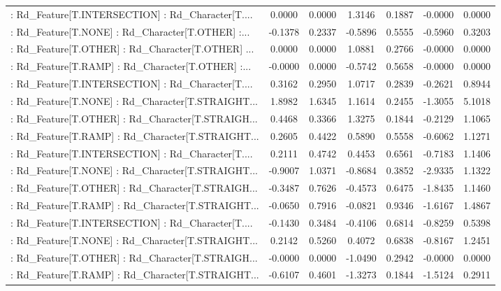 \begin{longtable}{p{4cm}cccccc}
 : Rd\_Feature[T.INTERSECTION] : Rd\_Character[T.... &  0.0000 &    0.0000 &  1.3146 &       0.1887 & -0.0000 &  0.0000 \\
 : Rd\_Feature[T.NONE] : Rd\_Character[T.OTHER] :... & -0.1378 &    0.2337 & -0.5896 &       0.5555 & -0.5960 &  0.3203 \\
 : Rd\_Feature[T.OTHER] : Rd\_Character[T.OTHER] ... &  0.0000 &    0.0000 &  1.0881 &       0.2766 & -0.0000 &  0.0000 \\
 : Rd\_Feature[T.RAMP] : Rd\_Character[T.OTHER] :... & -0.0000 &    0.0000 & -0.5742 &       0.5658 & -0.0000 &  0.0000 \\
 : Rd\_Feature[T.INTERSECTION] : Rd\_Character[T.... &  0.3162 &    0.2950 &  1.0717 &       0.2839 & -0.2621 &  0.8944 \\
 : Rd\_Feature[T.NONE] : Rd\_Character[T.STRAIGHT... &  1.8982 &    1.6345 &  1.1614 &       0.2455 & -1.3055 &  5.1018 \\
 : Rd\_Feature[T.OTHER] : Rd\_Character[T.STRAIGH... &  0.4468 &    0.3366 &  1.3275 &       0.1844 & -0.2129 &  1.1065 \\
 : Rd\_Feature[T.RAMP] : Rd\_Character[T.STRAIGHT... &  0.2605 &    0.4422 &  0.5890 &       0.5558 & -0.6062 &  1.1271 \\
 : Rd\_Feature[T.INTERSECTION] : Rd\_Character[T.... &  0.2111 &    0.4742 &  0.4453 &       0.6561 & -0.7183 &  1.1406 \\
 : Rd\_Feature[T.NONE] : Rd\_Character[T.STRAIGHT... & -0.9007 &    1.0371 & -0.8684 &       0.3852 & -2.9335 &  1.1322 \\
 : Rd\_Feature[T.OTHER] : Rd\_Character[T.STRAIGH... & -0.3487 &    0.7626 & -0.4573 &       0.6475 & -1.8435 &  1.1460 \\
 : Rd\_Feature[T.RAMP] : Rd\_Character[T.STRAIGHT... & -0.0650 &    0.7916 & -0.0821 &       0.9346 & -1.6167 &  1.4867 \\
 : Rd\_Feature[T.INTERSECTION] : Rd\_Character[T.... & -0.1430 &    0.3484 & -0.4106 &       0.6814 & -0.8259 &  0.5398 \\
 : Rd\_Feature[T.NONE] : Rd\_Character[T.STRAIGHT... &  0.2142 &    0.5260 &  0.4072 &       0.6838 & -0.8167 &  1.2451 \\
 : Rd\_Feature[T.OTHER] : Rd\_Character[T.STRAIGH... & -0.0000 &    0.0000 & -1.0490 &       0.2942 & -0.0000 &  0.0000 \\
 : Rd\_Feature[T.RAMP] : Rd\_Character[T.STRAIGHT... & -0.6107 &    0.4601 & -1.3273 &       0.1844 & -1.5124 &  0.2911 \\

\end{longtable}
